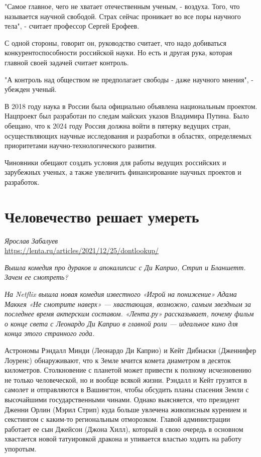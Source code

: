 "Самое главное, чего не хватает отечественным ученым, - воздуха. Того, что называется научной свободой. Страх сейчас проникает во все поры научного тела", - считает профессор Сергей Ерофеев.

С одной стороны, говорит он, руководство считает, что надо добиваться конкурентоспособности российской науки. Но есть и другая рука, которая главной своей задачей считает контроль.

"А контроль над обществом не предполагает свободы - даже научного мнения", - убежден ученый.

В 2018 году наука в России была официально объявлена национальным проектом. Нацпроект был разработан по следам майских указов Владимира Путина. Было обещано, что к 2024 году Россия должна войти в пятерку ведущих стран, осуществляющих научные исследования и разработки в областях, определяемых приоритетами научно-технологического развития.

Чиновники  обещают создать  условия для работы ведущих российских и зарубежных ученых, а также увеличить финансирование научных проектов и разработок.


\section{Человечество решает умереть}
\textit{Ярослав Забалуев}\\
\url{https://lenta.ru/articles/2021/12/25/dontlookup/}

{\it Вышла комедия про дураков и апокалипсис с Ди Каприо, Стрип и Бланшетт. Зачем ее смотреть?}

\textit{На Netflix вышла новая комедия известного «Игрой на понижение» Адама Маккея «Не смотрите наверх» — хвастающая, возможно, самым звездным за последнее время актерским составом. «Лента.ру» рассказывает, почему фильм о конце света с Леонардо Ди Каприо в главной роли — идеальное кино для конца этого странного года.}

Астрономы Рэндалл Минди (Леонардо Ди Каприо) и Кейт Дибиаски (Дженнифер Лоуренс) обнаруживают, что к Земле мчится комета диаметром в десяток километров. Столкновение с планетой может привести к полному исчезновению не только человеческой, но и вообще всякой жизни. Рэндалл и Кейт грузятся в самолет и отправляются в Вашингтон, чтобы обсудить планы спасения Земли с высочайшими государственными чинами. Однако выясняется, что президент Дженни Орлин (Мэрил Стрип) куда больше увлечена живописным курением и секстингом с каким-то региональным отморозком. Главой администрации работает ее сын Джейсон (Джона Хилл), который в свою очередь в основном хвастается новой татуировкой дракона и упивается властью ходить на работу упоротым.

